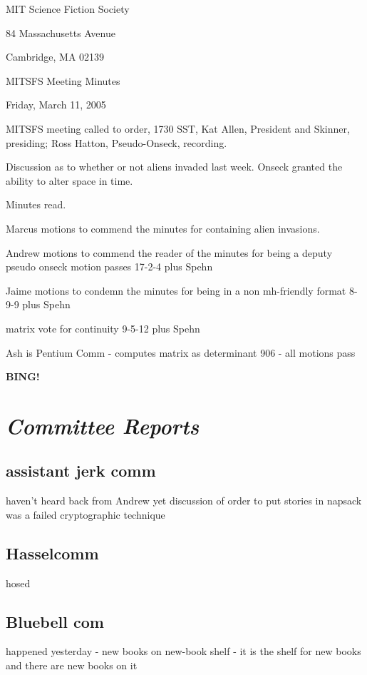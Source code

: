 \documentclass[10pt]{article}
\newcommand{\bing}{{\bf BING!} }
\newcommand{\goto}[1]{\bing \vskip 12pt \section*{{\em{#1}}}}
\newcommand{\ps}{ plus Spehn\xspace}
\begin{document}
\begin{center}

MIT Science Fiction Society

84 Massachusetts Avenue

Cambridge, MA 02139

\vspace{12pt}

MITSFS Meeting Minutes

Friday, March 11, 2005

\end{center}

\vspace{18pt}

\setlength{\parskip}{6pt}

\noindent
MITSFS meeting called to order, 1730 SST, Kat Allen, President and
Skinner, presiding; Ross Hatton,  Pseudo-Onseck, recording.

Discussion as to whether or not aliens invaded last week.  Onseck granted the ability to alter space in time.

Minutes read.

Marcus motions to commend the minutes for containing alien invasions.

Andrew motions to commend the reader of the minutes for being a deputy pseudo onseck motion passes 17-2-4\ps

Jaime motions to condemn the minutes for being in a non mh-friendly format 8-9-9\ps

matrix vote for continuity 9-5-12\ps

Ash is Pentium Comm - computes matrix as determinant 906 - all motions pass

\goto{Committee Reports}

\subsection*{assistant jerk comm}
haven't heard back from Andrew yet
discussion of order to put stories in
napsack was a failed cryptographic technique

\subsection*{Hasselcomm}
hosed

\subsection*{Bluebell com}
 happened yesterday - new books on new-book shelf - it is the shelf for new books and there are new books on it
\end{document}
